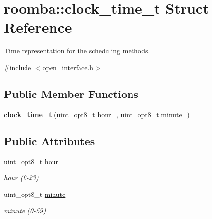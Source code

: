 \hypertarget{structroomba_1_1clock__time__t}{\section{roomba\+:\+:clock\+\_\+time\+\_\+t Struct Reference}
\label{structroomba_1_1clock__time__t}
}


Time representation for the scheduling methods.  




{\ttfamily \#include $<$open\+\_\+interface.\+h$>$}

\subsection*{Public Member Functions}
\begin{DoxyCompactItemize}
\item 
\hypertarget{structroomba_1_1clock__time__t_a4eea30093fabde59d947535780b85a32}{{\bfseries clock\+\_\+time\+\_\+t} (uint\+\_\+opt8\+\_\+t hour\+\_, uint\+\_\+opt8\+\_\+t minute\+\_)}\label{structroomba_1_1clock__time__t_a4eea30093fabde59d947535780b85a32}

\end{DoxyCompactItemize}
\subsection*{Public Attributes}
\begin{DoxyCompactItemize}
\item 
\hypertarget{structroomba_1_1clock__time__t_a5192ee84e402e998c2f3d8281fc45170}{uint\+\_\+opt8\+\_\+t \hyperlink{structroomba_1_1clock__time__t_a5192ee84e402e998c2f3d8281fc45170}{hour}}\label{structroomba_1_1clock__time__t_a5192ee84e402e998c2f3d8281fc45170}

\begin{DoxyCompactList}\small\item\em hour (0-\/23) \end{DoxyCompactList}\item 
\hypertarget{structroomba_1_1clock__time__t_aa93ca92ef49c9924de5d9f9daa659747}{uint\+\_\+opt8\+\_\+t \hyperlink{structroomba_1_1clock__time__t_aa93ca92ef49c9924de5d9f9daa659747}{minute}}\label{structroomba_1_1clock__time__t_aa93ca92ef49c9924de5d9f9daa659747}

\begin{DoxyCompactList}\small\item\em minute (0-\/59) \end{DoxyCompactList}\end{DoxyCompactItemize}


